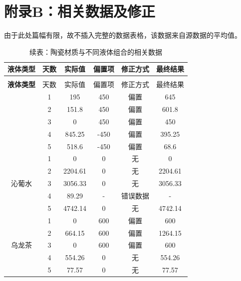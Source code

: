 \documentclass[12pt,a4paper]{ctexart}
\begin{document}
\section{附录B：相关数据及修正}
由于此处篇幅有限，故不插入完整的数据表格，该数据来自源数据的平均值。
\begin{longtable}{c c c c c c}
  \caption{陶瓷材质与不同液体组合的相关数据} \\
  \toprule
  \textbf{液体类型} & 天数 & 实际值 & 偏置项 & 修正方式 & 最终结果 \\
  \midrule
  \endfirsthead  %
  
  \caption*{续表：陶瓷材质与不同液体组合的相关数据} \\
  \toprule
  \textbf{液体类型} & 天数 & 实际值 & 偏置项 & 修正方式 & 最终结果 \\
  \midrule
  \endhead  %
  
  \bottomrule
  \endlastfoot  %

  \multirow{5}{*}{水} 
    & 1 & 195      & 450    & 偏置      & 645      \\
    & 2 & 151.8    & 450    & 偏置       & 601.8    \\
    & 3 & 0        & 450    & 偏置     & 450      \\
    & 4 & 845.25   & -450   & 偏置     & 395.25   \\
    & 5 & 518.6    & -450   & 偏置     & 68.6     \\
  \midrule
  
  \multirow{5}{*}{沁葡水} 
    & 1 & 0        & 0      & 无     & 0        \\
    & 2 & 2204.61  & 0      & 无     & 2204.61  \\
    & 3 & 3056.33  & 0      & 无     & 3056.33  \\
    & 4 & 89.29    & -   & 错误数据     & -  \\
    & 5 & 4742.14  & 0      & 无       & 4742.14  \\
  \midrule
  
  \multirow{5}{*}{乌龙茶} 
    & 1 & 0        & 600    & 偏置     & 600      \\
    & 2 & 664.15   & 600    & 偏置     & 1264.15  \\
    & 3 & 0        & 600    & 偏置     & 600      \\
    & 4 & 554.26   & 0      & 无       & 554.26   \\
    & 5 & 77.57    & 0      & 无       & 77.57    \\

\end{longtable}
\end{document}
